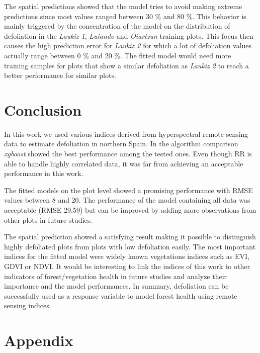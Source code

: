 \documentclass[review]{elsarticle}
\begin{document}
\noindent The spatial predictions showed that the model tries to avoid making extreme predictions since most values ranged between 30 \% and 80 \%.
This behavior is mainly triggered by the concentration of the model on the distribution of defoliation in the \textit{Laukiz 1}, \textit{Luiando} and \textit{Oiartzun} training plots.
This focus then causes the high prediction error for \textit{Laukiz 2} for which a lot of defoliation values actually range between 0 \% and 20 \%.
The fitted model would need more training samples for plots that show a similar defoliation as \textit{Laukiz 2} to reach a better performance for similar plots.

\section{Conclusion}

\noindent In this work we used various indices derived from hyperspectral remote sensing data to estimate defoliation in northern Spain.
In the algorithm comparison \textit{xgboost} showed the best performance among the tested ones.
Even though \ac{RR} is able to handle highly correlated data, it was far from achieving an acceptable performance in this work.

The fitted models on the plot level showed a promising performance with RMSE values between 8 and 20.
The performance of the model containing all data was acceptable (RMSE 29.59) but can be improved by adding more observations from other plots in future studies.

The spatial prediction showed a satisfying result making it possible to distinguish highly defoliated plots from plots with low defoliation easily.
The most important indices for the fitted model were widely known vegetations indices such as EVI, GDVI or NDVI.
It would be interesting to link the indices of this work to other indicators of forest/vegetation health in future studies and analyze their importance and the model performances.
In summary, defoliation can be successfully used as a response variable to model forest health using remote sensing indices.

\section{Appendix}

\appendix
\gdef\thesection{\Alph{section}} %
\makeatletter
\renewcommand\@seccntformat[1]{Appendix \csname the#1\endcsname.\hspace{0.5em}}
\makeatother
\end{document}
